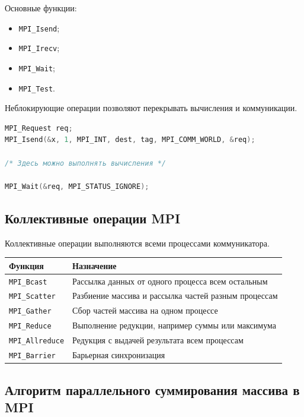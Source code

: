 \documentclass[12pt,a4paper]{article}
\begin{document}
Основные функции:
\begin{itemize}
    \item \texttt{MPI\_Isend};
    \item \texttt{MPI\_Irecv};
    \item \texttt{MPI\_Wait};
    \item \texttt{MPI\_Test}.
\end{itemize}

Неблокирующие операции позволяют перекрывать вычисления и коммуникации.

\begin{lstlisting}[language=C]
MPI_Request req;
MPI_Isend(&x, 1, MPI_INT, dest, tag, MPI_COMM_WORLD, &req);

/* Здесь можно выполнять вычисления */

MPI_Wait(&req, MPI_STATUS_IGNORE);
\end{lstlisting}

\subsection{Коллективные операции MPI}

Коллективные операции выполняются всеми процессами коммуникатора.

\begin{center}
\begin{tabular}{|p{5cm}|p{9cm}|}
\hline
\textbf{Функция} & \textbf{Назначение} \\
\hline
\texttt{MPI\_Bcast} & Рассылка данных от одного процесса всем остальным \\
\hline
\texttt{MPI\_Scatter} & Разбиение массива и рассылка частей разным процессам \\
\hline
\texttt{MPI\_Gather} & Сбор частей массива на одном процессе \\
\hline
\texttt{MPI\_Reduce} & Выполнение редукции, например суммы или максимума \\
\hline
\texttt{MPI\_Allreduce} & Редукция с выдачей результата всем процессам \\
\hline
\texttt{MPI\_Barrier} & Барьерная синхронизация \\
\hline
\end{tabular}
\end{center}

\subsection{Алгоритм параллельного суммирования массива в MPI}
\end{document}
